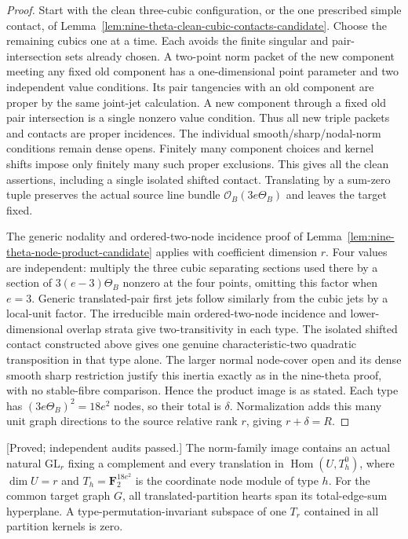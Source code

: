 \begin{proof}
Start with the clean three-cubic configuration, or the one prescribed
simple contact, of
Lemma~\ref{lem:nine-theta-clean-cubic-contacts-candidate}.
Choose the remaining cubics one at a time. Each avoids the finite
singular and pair-intersection sets already chosen. A two-point
norm packet of the new component meeting any fixed old component
has a one-dimensional point parameter and two independent value
conditions. Its pair tangencies with an old component are proper
by the same joint-jet calculation. A new component through a fixed
old pair intersection is a single nonzero value condition. Thus
all new triple packets and contacts are proper incidences.
The individual smooth/sharp/nodal-norm conditions remain dense
opens. Finitely many component choices and kernel shifts impose
only finitely many such proper exclusions. This gives all the
clean assertions, including a single isolated shifted contact.
Translating by a sum-zero tuple preserves the actual source
line bundle $\mathcal O_B(3e\Theta_B)$ and leaves the target fixed.

The generic nodality and ordered-two-node incidence proof of
Lemma~\ref{lem:nine-theta-node-product-candidate} applies with
coefficient dimension $r$. Four values are independent: multiply
the three cubic separating sections used there by a section of
$3(e-3)\Theta_B$ nonzero at the four points, omitting this factor
when $e=3$. Generic translated-pair first jets follow similarly
from the cubic jets by a local-unit factor. The irreducible main
ordered-two-node incidence and lower-dimensional overlap strata
give two-transitivity in each type. The isolated shifted contact
constructed above gives one genuine characteristic-two quadratic
transposition in that type alone. The larger normal node-cover
open and its dense smooth sharp restriction justify this inertia
exactly as in the nine-theta proof, with no stable-fibre comparison.
Hence the product image is as stated. Each type has
$(3e\Theta_B)^2=18e^2$ nodes, so their total is $\delta$.
Normalization adds this many unit graph directions to the source
relative rank $r$, giving $r+\delta=R$.
\end{proof}

\begin{proposition}
\label{prop:cubic-component-weighted-graph-gluing-candidate}
\textup{[Proved; independent audits passed.]}
The norm-family image contains an actual natural
$\mathrm{GL}_r$ fixing a complement and every translation in
$\operatorname{Hom}(U,T_h^0)$, where $\dim U=r$ and
$T_h=\mathbf F_2^{18e^2}$ is the coordinate node module of type $h$.
For the common target graph $G$, all translated-partition hearts
span its total-edge-sum hyperplane. A type-permutation-invariant
subspace of one $T_r$ contained in all partition kernels is zero.
\end{proposition}

